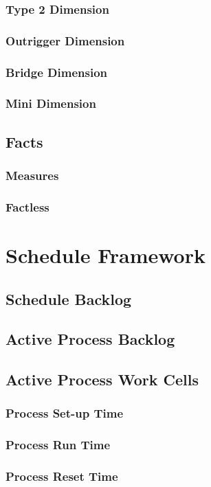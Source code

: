 \documentclass{acm_proc_article-sp}
\begin{document}
\subsubsection{Type 2 Dimension}
\subsubsection{Outrigger Dimension}
\subsubsection{Bridge Dimension}
\subsubsection{Mini Dimension}
\subsection{Facts}
\subsubsection{Measures}
\subsubsection{Factless}
\newpage
\section{Schedule Framework}
\subsection{Schedule Backlog}
\subsection{Active Process Backlog}
\subsection{Active Process Work Cells}
\subsubsection{Process Set-up Time}
\subsubsection{Process Run Time}
\subsubsection{Process Reset Time}
\end{document}
